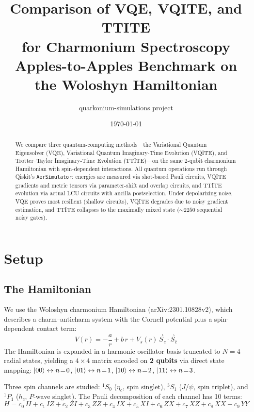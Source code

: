\documentclass[11pt,a4paper]{article}
\title{Comparison of VQE, VQITE, and TTITE\\
  for Charmonium Spectroscopy\\[0.5em]
  \large Apples-to-Apples Benchmark on the Woloshyn Hamiltonian}
\author{quarkonium-simulations project}
\date{\today}
\begin{document}
\maketitle

\begin{abstract}
We compare three quantum-computing methods---the Variational Quantum
Eigensolver (VQE), Variational Quantum Imaginary-Time Evolution (VQITE),
and Trotter--Taylor Imaginary-Time Evolution (TTITE)---on the same
2-qubit charmonium Hamiltonian with spin-dependent interactions.
All quantum operations run through Qiskit's \texttt{AerSimulator}:
energies are measured via shot-based Pauli circuits, VQITE gradients
and metric tensors via parameter-shift and overlap circuits, and TTITE
evolution via actual LCU circuits with ancilla postselection.
Under depolarizing noise, VQE proves most resilient (shallow circuits),
VQITE degrades due to noisy gradient estimation, and TTITE collapses
to the maximally mixed state ($\sim\!2250$ sequential noisy gates).
\end{abstract}

\tableofcontents
\newpage

\section{Setup}

\subsection{The Hamiltonian}

We use the Woloshyn charmonium Hamiltonian (arXiv:2301.10828v2), which
describes a charm--anticharm system with the Cornell potential plus a
spin-dependent contact term:
\begin{equation}
  V(r) = -\frac{a}{r} + b\,r + V_s(r)\,\vec{S}_c \cdot \vec{S}_{\bar{c}}
\end{equation}
The Hamiltonian is expanded in a harmonic oscillator basis truncated
to $N=4$ radial states, yielding a $4 \times 4$ matrix encoded on
\textbf{2 qubits} via direct state mapping:
$\ket{00} \leftrightarrow n\!=\!0$, \;
$\ket{01} \leftrightarrow n\!=\!1$, \;
$\ket{10} \leftrightarrow n\!=\!2$, \;
$\ket{11} \leftrightarrow n\!=\!3$.

Three spin channels are studied:
${}^1S_0$ ($\eta_c$, spin singlet),
${}^3S_1$ ($J/\psi$, spin triplet), and
${}^1P_1$ ($h_c$, $P$-wave singlet).
The Pauli decomposition of each channel has 10 terms:
\begin{equation}
  H = c_0\,II + c_1\,IZ + c_2\,ZI + c_3\,ZZ + c_4\,IX + c_5\,XI
    + c_6\,ZX + c_7\,XZ + c_8\,XX + c_9\,YY
\end{equation}
\end{document}
